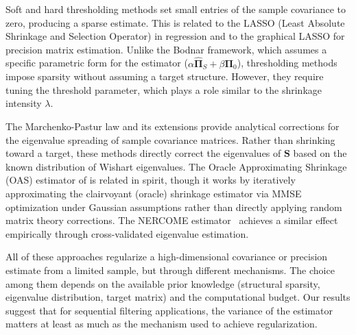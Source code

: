 Soft and hard thresholding methods set small entries of the sample covariance to zero, producing a sparse estimate. This is related to the LASSO (Least Absolute Shrinkage and Selection Operator) in regression and to the graphical LASSO for precision matrix estimation. Unlike the Bodnar framework, which assumes a specific parametric form for the estimator ($\alpha \hat{\boldsymbol{\Pi}}_S + \beta \boldsymbol{\Pi}_0$), thresholding methods impose sparsity without assuming a target structure. However, they require tuning the threshold parameter, which plays a role similar to the shrinkage intensity $\lambda$.

The Marchenko-Pastur law and its extensions provide analytical corrections for the eigenvalue spreading of sample covariance matrices. Rather than shrinking toward a target, these methods directly correct the eigenvalues of $\mathbf{S}$ based on the known distribution of Wishart eigenvalues. The Oracle Approximating Shrinkage (OAS) estimator of \citep{chen2010shrinkage} is related in spirit, though it works by iteratively approximating the clairvoyant (oracle) shrinkage estimator via MMSE optimization under Gaussian assumptions rather than directly applying random matrix theory corrections. The NERCOME estimator~\citep{lam2016nonparametric} achieves a similar effect empirically through cross-validated eigenvalue estimation.

All of these approaches regularize a high-dimensional covariance or precision estimate from a limited sample, but through different mechanisms. The choice among them depends on the available prior knowledge (structural sparsity, eigenvalue distribution, target matrix) and the computational budget. Our results suggest that for sequential filtering applications, the variance of the estimator matters at least as much as the mechanism used to achieve regularization.
